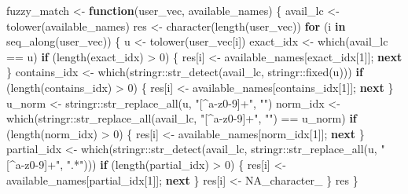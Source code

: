 \documentclass[
  letterpaper,
  DIV=11,
  numbers=noendperiod]{scrartcl}
\newenvironment{Shaded}{\begin{snugshade}}{\end{snugshade}}
\newcommand{\ConstantTok}[1]{\textcolor[rgb]{0.56,0.35,0.01}{#1}}
\newcommand{\ControlFlowTok}[1]{\textcolor[rgb]{0.00,0.23,0.31}{\textbf{#1}}}
\newcommand{\DecValTok}[1]{\textcolor[rgb]{0.68,0.00,0.00}{#1}}
\newcommand{\FunctionTok}[1]{\textcolor[rgb]{0.28,0.35,0.67}{#1}}
\newcommand{\NormalTok}[1]{\textcolor[rgb]{0.00,0.23,0.31}{#1}}
\newcommand{\OtherTok}[1]{\textcolor[rgb]{0.00,0.23,0.31}{#1}}
\newcommand{\SpecialCharTok}[1]{\textcolor[rgb]{0.37,0.37,0.37}{#1}}
\newcommand{\StringTok}[1]{\textcolor[rgb]{0.13,0.47,0.30}{#1}}
\begin{document}
\begin{Shaded}
\begin{Highlighting}[]
\NormalTok{fuzzy\_match }\OtherTok{\textless{}{-}} \ControlFlowTok{function}\NormalTok{(user\_vec, available\_names) \{}
\NormalTok{  avail\_lc }\OtherTok{\textless{}{-}} \FunctionTok{tolower}\NormalTok{(available\_names)}
\NormalTok{  res }\OtherTok{\textless{}{-}} \FunctionTok{character}\NormalTok{(}\FunctionTok{length}\NormalTok{(user\_vec))}
  \ControlFlowTok{for}\NormalTok{ (i }\ControlFlowTok{in} \FunctionTok{seq\_along}\NormalTok{(user\_vec)) \{}
\NormalTok{    u }\OtherTok{\textless{}{-}} \FunctionTok{tolower}\NormalTok{(user\_vec[i])}
\NormalTok{    exact\_idx }\OtherTok{\textless{}{-}} \FunctionTok{which}\NormalTok{(avail\_lc }\SpecialCharTok{==}\NormalTok{ u)}
    \ControlFlowTok{if}\NormalTok{ (}\FunctionTok{length}\NormalTok{(exact\_idx) }\SpecialCharTok{\textgreater{}} \DecValTok{0}\NormalTok{) \{ res[i] }\OtherTok{\textless{}{-}}\NormalTok{ available\_names[exact\_idx[}\DecValTok{1}\NormalTok{]]; }\ControlFlowTok{next}\NormalTok{ \}}
\NormalTok{    contains\_idx }\OtherTok{\textless{}{-}} \FunctionTok{which}\NormalTok{(stringr}\SpecialCharTok{::}\FunctionTok{str\_detect}\NormalTok{(avail\_lc, stringr}\SpecialCharTok{::}\FunctionTok{fixed}\NormalTok{(u)))}
    \ControlFlowTok{if}\NormalTok{ (}\FunctionTok{length}\NormalTok{(contains\_idx) }\SpecialCharTok{\textgreater{}} \DecValTok{0}\NormalTok{) \{ res[i] }\OtherTok{\textless{}{-}}\NormalTok{ available\_names[contains\_idx[}\DecValTok{1}\NormalTok{]]; }\ControlFlowTok{next}\NormalTok{ \}}
\NormalTok{    u\_norm }\OtherTok{\textless{}{-}}\NormalTok{ stringr}\SpecialCharTok{::}\FunctionTok{str\_replace\_all}\NormalTok{(u, }\StringTok{"[\^{}a{-}z0{-}9]+"}\NormalTok{, }\StringTok{""}\NormalTok{)}
\NormalTok{    norm\_idx }\OtherTok{\textless{}{-}} \FunctionTok{which}\NormalTok{(stringr}\SpecialCharTok{::}\FunctionTok{str\_replace\_all}\NormalTok{(avail\_lc, }\StringTok{"[\^{}a{-}z0{-}9]+"}\NormalTok{, }\StringTok{""}\NormalTok{) }\SpecialCharTok{==}\NormalTok{ u\_norm)}
    \ControlFlowTok{if}\NormalTok{ (}\FunctionTok{length}\NormalTok{(norm\_idx) }\SpecialCharTok{\textgreater{}} \DecValTok{0}\NormalTok{) \{ res[i] }\OtherTok{\textless{}{-}}\NormalTok{ available\_names[norm\_idx[}\DecValTok{1}\NormalTok{]]; }\ControlFlowTok{next}\NormalTok{ \}}
\NormalTok{    partial\_idx }\OtherTok{\textless{}{-}} \FunctionTok{which}\NormalTok{(stringr}\SpecialCharTok{::}\FunctionTok{str\_detect}\NormalTok{(avail\_lc, stringr}\SpecialCharTok{::}\FunctionTok{str\_replace\_all}\NormalTok{(u, }\StringTok{"[\^{}a{-}z0{-}9]+"}\NormalTok{, }\StringTok{".*"}\NormalTok{)))}
    \ControlFlowTok{if}\NormalTok{ (}\FunctionTok{length}\NormalTok{(partial\_idx) }\SpecialCharTok{\textgreater{}} \DecValTok{0}\NormalTok{) \{ res[i] }\OtherTok{\textless{}{-}}\NormalTok{ available\_names[partial\_idx[}\DecValTok{1}\NormalTok{]]; }\ControlFlowTok{next}\NormalTok{ \}}
\NormalTok{    res[i] }\OtherTok{\textless{}{-}} \ConstantTok{NA\_character\_}
\NormalTok{  \}}
\NormalTok{  res}
\NormalTok{\}}


\end{Highlighting}
\end{Shaded}
\end{document}
